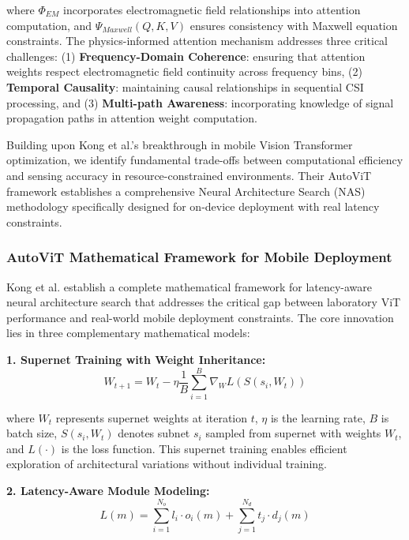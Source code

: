 \documentclass[journal]{IEEEtran}
\begin{document}
where $\Phi_{EM}$ incorporates electromagnetic field relationships into attention computation, and $\Psi_{Maxwell}(Q,K,V)$ ensures consistency with Maxwell equation constraints. The physics-informed attention mechanism addresses three critical challenges: (1) \textbf{Frequency-Domain Coherence}: ensuring that attention weights respect electromagnetic field continuity across frequency bins, (2) \textbf{Temporal Causality}: maintaining causal relationships in sequential CSI processing, and (3) \textbf{Multi-path Awareness}: incorporating knowledge of signal propagation paths in attention weight computation.

Building upon Kong et al.'s \cite{kong2025autovit} breakthrough in mobile Vision Transformer optimization, we identify fundamental trade-offs between computational efficiency and sensing accuracy in resource-constrained environments. Their AutoViT framework establishes a comprehensive Neural Architecture Search (NAS) methodology specifically designed for on-device deployment with real latency constraints.

\subsubsection{AutoViT Mathematical Framework for Mobile Deployment}

Kong et al. establish a complete mathematical framework for latency-aware neural architecture search that addresses the critical gap between laboratory ViT performance and real-world mobile deployment constraints. The core innovation lies in three complementary mathematical models:

\textbf{1. Supernet Training with Weight Inheritance:}
\begin{equation}
W_{t+1} = W_t - \eta \frac{1}{B} \sum_{i=1}^{B} \nabla_W L(S(s_i, W_t))
\label{eq:autovit_supernet}
\end{equation}

where $W_t$ represents supernet weights at iteration $t$, $\eta$ is the learning rate, $B$ is batch size, $S(s_i, W_t)$ denotes subnet $s_i$ sampled from supernet with weights $W_t$, and $L(\cdot)$ is the loss function. This supernet training enables efficient exploration of architectural variations without individual training.

\textbf{2. Latency-Aware Module Modeling:}
\begin{equation}
L(m) = \sum_{i=1}^{N_o} l_i \cdot o_i(m) + \sum_{j=1}^{N_d} t_j \cdot d_j(m)
\label{eq:autovit_latency}
\end{equation}
\end{document}
